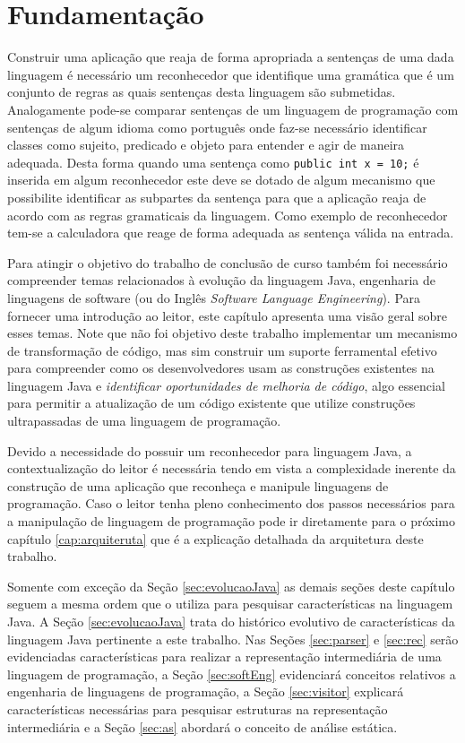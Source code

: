 \chapter{Fundamentação}
Construir uma aplicação que reaja de forma apropriada a sentenças de uma dada linguagem é necessário um reconhecedor que identifique uma gramática que é um conjunto de regras as quais sentenças desta linguagem são submetidas. Analogamente pode-se comparar sentenças de um linguagem de programação com sentenças de algum idioma como português onde faz-se necessário identificar classes como sujeito, predicado e objeto para entender e agir de maneira adequada. Desta forma quando uma sentença como \texttt{public int x = 10;} é inserida em algum reconhecedor este deve se dotado de algum mecanismo que possibilite identificar as subpartes da sentença para que a aplicação reaja de acordo com as regras gramaticais da linguagem. Como exemplo de reconhecedor tem-se a calculadora que reage de forma adequada as sentença válida na entrada.

Para atingir o objetivo do trabalho de conclusão de curso também foi necessário compreender temas relacionados à evolução da linguagem Java, engenharia de linguagens de software (ou do Inglês \emph{Software Language Engineering}). Para fornecer uma introdução ao leitor, este capítulo apresenta uma visão geral sobre esses temas. Note que não foi objetivo deste trabalho implementar um mecanismo de transformação de código, mas sim construir um suporte ferramental efetivo para compreender como os desenvolvedores usam as construções existentes na linguagem Java e \emph{identificar oportunidades de melhoria de código}, algo essencial para permitir a atualização de um código existente que utilize construções ultrapassadas de uma linguagem de programação.

Devido a necessidade do \NOMESOFTWARE possuir um reconhecedor para linguagem Java, a contextualização do leitor é necessária tendo em vista a complexidade inerente da construção de uma aplicação que reconheça e manipule linguagens de programação. Caso o leitor tenha pleno conhecimento dos passos necessários para a manipulação de linguagem de programação pode ir diretamente para o próximo capítulo \ref{cap:arquiteruta} que é a explicação detalhada da arquitetura deste trabalho. 

Somente com exceção da Seção \ref{sec:evolucaoJava} as demais seções deste capítulo seguem a mesma ordem que o \NOMESOFTWARE  utiliza para pesquisar características na linguagem Java. A Seção \ref{sec:evolucaoJava} trata do histórico evolutivo de características da linguagem Java pertinente a este trabalho. Nas Seções \ref{sec:parser} e \ref{sec:rec} serão evidenciadas características para realizar a representação intermediária de uma linguagem de programação, a Seção \ref{sec:softEng} evidenciará conceitos relativos a engenharia de linguagens de programação,  a Seção \ref{sec:visitor} explicará características necessárias para pesquisar estruturas na representação intermediária e a Seção \ref{sec:as} abordará o conceito de análise estática.

